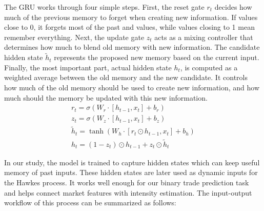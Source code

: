 The GRU works through four simple steps. First, the reset gate $r_t$ decides how much of the previous memory to forget when creating new information. If values close to 0, it forgets most of the past and values, while values closing to 1 mean remember everything. Next, the update gate $z_t$ acts as a mixing controller that determines how much to blend old memory with new information. The candidate hidden state $\tilde{h}_t$ represents the proposed new memory based on the current input. Finally, the most important part, actual hidden state $h_t$, is computed as a weighted average between the old memory and the new candidate. It controls how much of the old memory should be used to create new information, and how much should the memory be updated with this new information.
\begin{align}
    r_t = \sigma(W_r \cdot [h_{t-1}, x_t] + b_r) \\
    z_t = \sigma(W_z \cdot [h_{t-1}, x_t] + b_z) \\
    \tilde{h}_t = \tanh(W_h \cdot [r_t \odot h_{t-1}, x_t] + b_h) \\
    h_t = (1 - z_t) \odot h_{t-1} + z_t \odot \tilde{h}_t
\end{align}

In our study, the model is trained to capture hidden states which can keep useful memory of past inputs. These hidden states are later used as dynamic inputs for the Hawkes process. It works well enough for our binary trade prediction task and helps connect market features with intensity estimation. The input-output workflow of this process can be summarized as follows:

